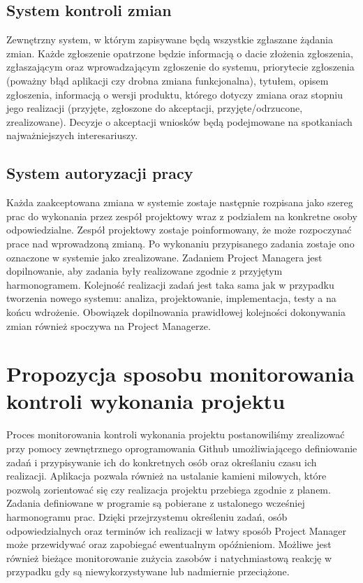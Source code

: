 \subsection*{System kontroli zmian}
Zewnętrzny system, w którym zapisywane będą wszystkie zgłaszane żądania zmian. Każde zgłoszenie opatrzone będzie informacją o dacie złożenia zgłoszenia, zgłaszającym oraz wprowadzającym zgłoszenie do systemu, priorytecie zgłoszenia (poważny błąd aplikacji czy drobna zmiana funkcjonalna), tytułem, opisem zgłoszenia, informacją o wersji produktu, którego dotyczy zmiana oraz stopniu jego realizacji (przyjęte, zgłoszone do akceptacji, przyjęte/odrzucone, zrealizowane). Decyzje o akceptacji wniosków będą podejmowane na spotkaniach najważniejszych interesariuszy.

\subsection*{System autoryzacji pracy}
Każda zaakceptowana zmiana w systemie zostaje następnie rozpisana jako szereg prac do wykonania przez zespół projektowy wraz z podziałem na konkretne osoby odpowiedzialne. Zespół projektowy zostaje poinformowany, że może rozpoczynać prace nad wprowadzoną zmianą. Po wykonaniu przypisanego zadania zostaje ono oznaczone w systemie jako zrealizowane. Zadaniem Project Managera jest dopilnowanie, aby zadania były realizowane zgodnie z przyjętym harmonogramem. Kolejność realizacji zadań jest taka sama jak w przypadku tworzenia nowego systemu: analiza, projektowanie, implementacja, testy a na końcu wdrożenie. Obowiązek dopilnowania prawidłowej kolejności dokonywania zmian również spoczywa na Project Managerze. 



\section{Propozycja sposobu monitorowania kontroli wykonania projektu}
Proces monitorowania kontroli wykonania projektu postanowiliśmy zrealizować przy pomocy zewnętrznego oprogramowania Github umożliwiającego definiowanie zadań i przypisywanie ich do konkretnych osób oraz określaniu czasu ich realizacji. Aplikacja pozwala również na ustalanie kamieni milowych, które pozwolą zorientować się czy realizacja projektu przebiega zgodnie z planem. 
	Zadania definiowane w programie są pobierane z ustalonego wcześniej harmonogramu prac. Dzięki przejrzystemu określeniu zadań, osób odpowiedzialnych oraz terminów ich realizacji w łatwy sposób Project Manager może przewidywać oraz zapobiegać ewentualnym opóźnieniom. Możliwe jest również bieżące monitorowanie zużycia zasobów i natychmiastową reakcję w przypadku gdy są niewykorzystywane lub nadmiernie przeciążone.




